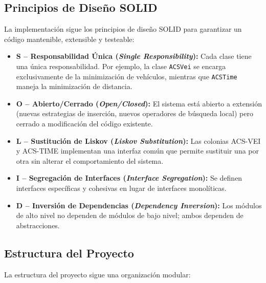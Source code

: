 \documentclass[12pt, letterpaper]{article}
\begin{document}
\subsection{Principios de Diseño SOLID}
\label{subsec:solid}

La implementación sigue los principios de diseño SOLID para garantizar un código mantenible, extensible y testeable:

\begin{itemize}[leftmargin=2cm]
  \item \textbf{S -- Responsabilidad Única (\textit{Single Responsibility}):} Cada clase tiene una única responsabilidad. Por ejemplo, la clase \texttt{ACSVei} se encarga exclusivamente de la minimización de vehículos, mientras que \texttt{ACSTime} maneja la minimización de distancia.
  \item \textbf{O -- Abierto/Cerrado (\textit{Open/Closed}):} El sistema está abierto a extensión (nuevas estrategias de inserción, nuevos operadores de búsqueda local) pero cerrado a modificación del código existente.
  \item \textbf{L -- Sustitución de Liskov (\textit{Liskov Substitution}):} Las colonias ACS-VEI y ACS-TIME implementan una interfaz común que permite sustituir una por otra sin alterar el comportamiento del sistema.
  \item \textbf{I -- Segregación de Interfaces (\textit{Interface Segregation}):} Se definen interfaces específicas y cohesivas en lugar de interfaces monolíticas.
  \item \textbf{D -- Inversión de Dependencias (\textit{Dependency Inversion}):} Los módulos de alto nivel no dependen de módulos de bajo nivel; ambos dependen de abstracciones.
\end{itemize}

\subsection{Estructura del Proyecto}
\label{subsec:estructura}

La estructura del proyecto sigue una organización modular:
\end{document}
